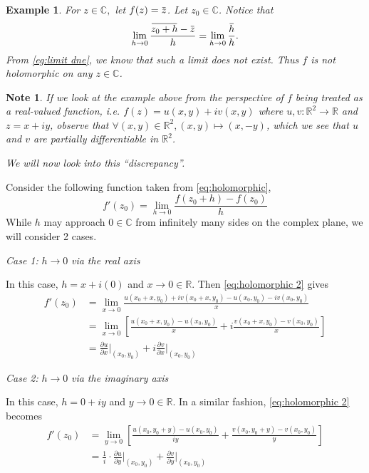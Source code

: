 \documentclass[11pt, oneside]{book}
\theoremstyle{break}
\newtheorem*{note}{Note}
\newtheorem{eg}{Example}[section]
\renewcommand{\bar}[1]{\mkern 1.5mu \overline{\mkern -1.5mu #1 \mkern -1.5mu} \mkern 1.5mu}
\begin{document}
\begin{eg}
	For $z \in \mathbb{C},$ let $f(z) = \bar{z}$. Let $z_0 \in \mathbb{C}$. Notice that
	\begin{equation*}
		\lim_{h \to 0} \frac{\bar{z_0 + h} - \bar{z}}{h} = \lim_{h \to 0} \frac{\bar{h}}{h}.
	\end{equation*}
	From \cref{eg:limit dne}, we know that such a limit does not exist. Thus $f$ is not holomorphic on any $z \in \mathbb{C}$.
\end{eg}

\begin{note}
	If we look at the example above from the perspective of $f$ being treated as a real-valued function, i.e. $f(z) = u(x, y) + iv(x, y)$ where $u, v: \mathbb{R}^2 \to \mathbb{R}$ and $z = x + iy$, observe that $\forall (x, y) \in \mathbb{R}^2, (x, y) \mapsto (x, -y)$, which we see that $u$ and $v$ are partially differentiable in $\mathbb{R}^2$.

	We will now look into this ``discrepancy''.
\end{note}

Consider the following function taken from \cref{eq:holomorphic},
\begin{equation}\label{eq:holomorphic 2}
	f'(z_0) = \lim_{h \to 0} \frac{f(z_0 + h) - f(z_0)}{h}
\end{equation}
While $h$ may approach $0 \in \mathbb{C}$ from infinitely many sides on the complex plane, we will consider 2 cases.

\textit{Case 1: }$\mathit{h \to 0}$\textit{ via the real axis}

In this case, $h = x + i(0)$ and $x \to 0 \in \mathbb{R}$. Then \cref{eq:holomorphic 2} gives
\begin{align}
	f'(z_0) &= \lim_{x \to 0} \frac{u(x_0 + x, y_0) + iv(x_0 + x, y_0) - u(x_0, y_0) - iv(x_0, y_0)}{x} \nonumber \\
		&= \lim_{x \to 0} \left[ \frac{u(x_0 + x, y_0) - u(x_0, y_0)}{x} + i \frac{v(x_0 + x, y_0) - v(x_0, y_0)}{x} \right] \nonumber \\
		&= \frac{\partial u}{\partial x} \Bigr|_{(x_0, y_0)} + i \frac{\partial v}{\partial x} \Bigr|_{(x_0, y_0)} \label{eq:holomorphic approach via real axis}
\end{align}

\textit{Case 2: }$\mathit{h \to 0}$\textit{ via the imaginary axis}

In this case, $h = 0 + iy$ and $y \to 0 \in \mathbb{R}$. In a similar fashion, \cref{eq:holomorphic 2} becomes
\begin{align}
	f'(z_0) &= \lim_{y \to 0} \left[ \frac{u(x_0, y_0 + y) - u(x_0, y_0)}{iy} + \frac{v(x_0, y_0 + y) - v(x_0, y_0)}{y} \right] \nonumber \\
		&= \frac{1}{i} \cdot \frac{\partial u}{\partial y} \Bigr|_{(x_0, y_0)} + \frac{\partial v}{\partial y} \Bigr|_{(x_0, y_0)} \label{eq:holomorphic approach via imaginary axis}
\end{align}
\end{document}

